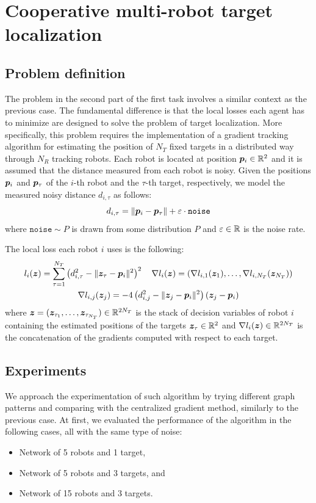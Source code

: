 \documentclass[a4paper,11pt,oneside]{book}
\begin{document}
\chapter{Cooperative multi-robot target localization} \label{ch:localization}


\section{Problem definition}

The problem in the second part of the first task involves a similar context as the previous case. The fundamental difference is that the local losses each agent has to minimize are designed to solve the problem of target localization. More specifically, this problem requires the implementation of a gradient tracking algorithm for estimating the position of $N_T$ fixed targets in a distributed way through $N_R$ tracking robots. Each robot is located at position ${\bm{p}}_i \in {\mathbb{R}}^2$ and it is assumed that the distance measured from each robot is noisy. Given the positions ${\bm{p}}_i$ and ${\bm{p}}_\tau$ of the $i$-th robot and the $\tau$-th target, respectively, we model the measured noisy distance $d_{i,\tau}$ as follows:
\[
      d_{i,\tau} = \Vert {\bm{p}}_i - {\bm{p}}_\tau \Vert + \varepsilon \cdot \texttt{noise}
\]
where $\texttt{noise} \sim P$ is drawn from some distribution $P$ and $\varepsilon \in {\mathbb{R}}$ is the noise rate.

The local loss each robot $i$ uses is the following:
\[
      \begin{gathered}
            l_i({\bm{z}}) = \sum_{\tau=1}^{N_T} \left( d_{i,\tau}^2 - \Vert {\bm{z}}_{\tau} - {\bm{p}}_i \Vert^2 \right)^2
            \quad
            \nabla l_{i}({\bm{z}}) = (\nabla l_{i,1}({\bm{z}}_{1}), \dots, \nabla l_{i,N_T}({\bm{z}}_{N_T}))
            \\
            \nabla l_{i,j}({\bm{z}}_{j}) = -4 \left( d_{i,j}^2 - \Vert {\bm{z}}_{j} - {\bm{p}}_i \Vert^2 \right) \left( {\bm{z}}_{j} - {\bm{p}}_i \right)
      \end{gathered}
\]
where ${\bm{z}} = ({\bm{z}}_{\tau_1}, \dots, {\bm{z}}_{\tau_{N_T}}) \in {\mathbb{R}}^{2N_T}$ is the stack of decision variables of robot $i$ containing the estimated positions of the targets ${\bm{z}}_{\tau} \in {\mathbb{R}}^2$ and $\nabla l_i({\bm{z}}) \in {\mathbb{R}}^{2N_T}$ is the concatenation of the gradients computed with respect to each target.


\section{Experiments}

We approach the experimentation of such algorithm by trying different graph patterns and comparing with the centralized gradient method, similarly to the previous case. At first, we evaluated the performance of the algorithm in the following cases, all with the same type of noise:
\begin{itemize}
      \item Network of 5 robots and 1 target,
      \item Network of 5 robots and 3 targets, and
      \item Network of 15 robots and 3 targets.
\end{itemize}
\end{document}
